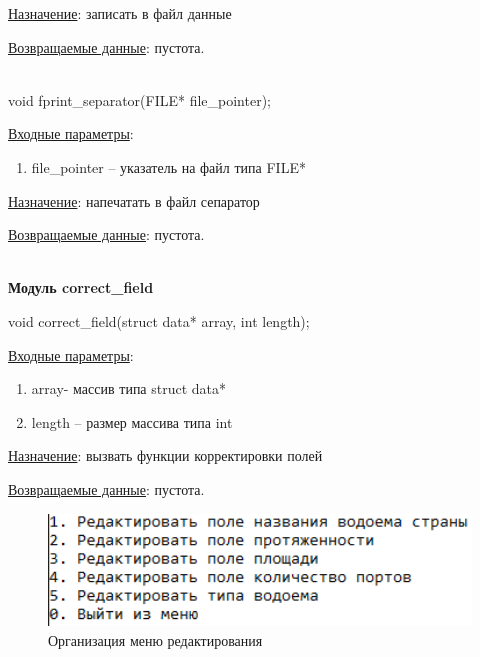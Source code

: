 \underline{Назначение}: записать в файл данные 

\underline{Возвращаемые данные}: пустота.

\hspace{0pt}\\



void fprint\_separator(FILE* file\_pointer);

\underline{Входные параметры}: 

\begin{enumerate}
    \item file\_pointer – указатель на файл типа FILE*
\end{enumerate}

\underline{Назначение}: напечатать в файл сепаратор

\underline{Возвращаемые данные}: пустота.

\hspace{0pt}\\



\textbf{Модуль correct\_field}

void correct\_field(struct data* array, int length);

\underline{Входные параметры}: 

\begin{enumerate}
    \item array- массив типа struct data*
    \item length – размер массива типа int
\end{enumerate}

\underline{Назначение}: вызвать функции корректировки полей 

\underline{Возвращаемые данные}: пустота.

\begin{figure}[!hp]
    \begin{center}
        \includegraphics[width=14cm]{_input/programmDevelopment/correctFieldMenu.png}
    \end{center}
    \caption{Организация меню редактирования\label{fig:menu}}
\end{figure}

